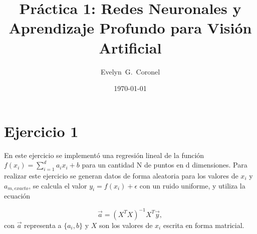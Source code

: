 





\title{Práctica 1: Redes Neuronales y Aprendizaje Profundo para Visión Artificial}
\author{Evelyn~G.~Coronel}


\date[]{\lowercase{\today}} %


\maketitle


\section*{Ejercicio 1}

En este ejercicio se implementó una regresión lineal de la función $f(x_i)= \sum_{i=1}^d a_{i}x_i+ b $ para un cantidad N de puntos en d dimensiones.  Para realizar este ejercicio se generan datos de forma aleatoria para los valores de $x_i$ y $a_{m,exacto}$, se calcula el valor $y_i=f(x_i) + \epsilon$ con un ruido uniforme, y utiliza la ecuación

\begin{equation}
     \vec a = (X^TX)^{-1}X^T \vec y,
     \label{eq:ejer1}
 \end{equation} 
con $\vec a$ representa a $\{a_i, b\}$  y $X$ son los valores de $x_i$ escrita en forma matricial.




